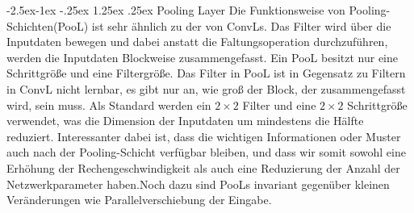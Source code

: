 \documentclass[12pt,a4paper]{scrartcl}
\makeatletter
\numberwithin{equation}{section}
\renewcommand\paragraph{\@startsection{paragraph}{4}{\z@}%
	{-2.5ex\@plus -1ex \@minus -.25ex}%
	{1.25ex \@plus .25ex}%
	{\normalfont\normalsize\bfseries}}
\makeatother
\begin{document}
\paragraph{Pooling Layer}\label{Pooling Layer}
Die Funktionsweise von Pooling-Schichten(\ac{PooL}) ist sehr ähnlich zu der von \acsp{ConvL}. Das Filter wird über die Inputdaten bewegen und dabei anstatt die Faltungsoperation durchzuführen, werden die Inputdaten Blockweise zusammengefasst. Ein PooL besitzt nur eine Schrittgröße und eine Filtergröße. Das Filter in PooL ist in Gegensatz zu Filtern in ConvL nicht lernbar, es gibt nur an, wie groß der Block, der zusammengefasst wird, sein muss.
Als Standard werden ein $ 2 \times 2 $ Filter und eine $ 2 \times 2 $ Schrittgröße verwendet, was die Dimension der Inputdaten um mindestens die Hälfte reduziert. Interessanter dabei ist, dass die wichtigen Informationen oder Muster auch nach der Pooling-Schicht verfügbar bleiben, und dass wir somit sowohl eine Erhöhung der Rechengeschwindigkeit als auch eine Reduzierung der Anzahl der Netzwerkparameter haben.Noch dazu sind \acsp{PooL}  invariant gegenüber kleinen Veränderungen wie Parallelverschiebung der Eingabe.
\end{document}
